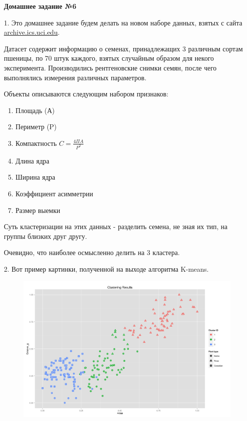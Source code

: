 \documentclass{article}
\begin{document}
$$$$
\large \textbf{Домашнее задание №6}

1. Это домашнее задание будем делать на новом наборе данных, взятых с сайта \href{https://archive.ics.uci.edu/ml/datasets/seeds}{archive.ics.uci.edu}. 

Датасет содержит информацию о семенах, принадлежащих 3 различным сортам пшеницы, по 70 штук каждого, взятых случайным образом для некого эксперимента. Производились рентгеновские снимки семян, после чего выполнялись измерения различных параметров.

Объекты описываются следующим набором признаков:

\begin{enumerate}
\item Площадь (А)
\item Периметр (P)
\item Компактность $C = \frac{4\Pi A}{P^2}$
\item Длина ядра
\item Ширина ядра
\item Коэффициент асимметрии
\item Размер выемки
\end{enumerate}

Суть кластеризации на этих данных - разделить семена, не зная их тип, на группы близких друг другу.

Очевидно, что наиболее осмысленно делить на 3 кластера.

\bigskip

2.  Вот пример картинки, полученной на выходе алгоритма K-means. 

\begin{figure}[H] 
\includegraphics[scale=0.55]{img/6_kmeans.png}
\label{fig :metka1}
\end{figure}
\end{document}
